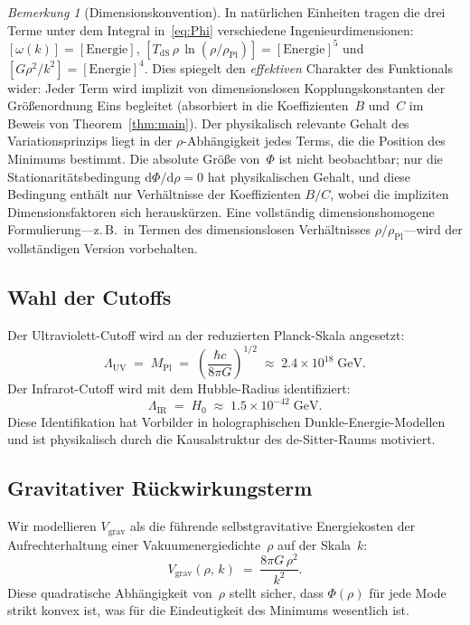 \documentclass[12pt,a4paper]{article}
\theoremstyle{definition}
\theoremstyle{plain}
\theoremstyle{remark}
\newtheorem{remark}[definition]{Bemerkung}
\newcommand{\LUV}{\Lambda_{\mathrm{UV}}}
\newcommand{\LIR}{\Lambda_{\mathrm{IR}}}
\newcommand{\dd}{\mathrm{d}}
\begin{document}
\begin{remark}[Dimensionskonvention]
In nat\"urlichen Einheiten tragen die drei Terme unter dem
Integral in~\eqref{eq:Phi} verschiedene
Ingenieurdimensionen:
$[\omega(k)] = [\mathrm{Energie}]$,
$[T_{\mathrm{dS}}\,\rho\,\ln(\rho/\rho_{\mathrm{Pl}})]
= [\mathrm{Energie}]^{5}$ und
$[G\rho^{2}/k^{2}] = [\mathrm{Energie}]^{4}$.
Dies spiegelt den \emph{effektiven} Charakter des Funktionals
wider: Jeder Term wird implizit von dimensionslosen
Kopplungskonstanten der Gr\"o\ss enordnung Eins begleitet
(absorbiert in die Koeffizienten~$B$ und~$C$ im Beweis von
Theorem~\ref{thm:main}). Der physikalisch relevante Gehalt des
Variationsprinzips liegt in der $\rho$-Abh\"angigkeit jedes
Terms, die die Position des Minimums bestimmt. Die absolute
Gr\"o\ss e von~$\Phi$ ist nicht beobachtbar; nur die
Stationarit\"atsbedingung $\dd\Phi/\dd\rho = 0$ hat
physikalischen Gehalt, und diese Bedingung enth\"alt nur
Verh\"altnisse der Koeffizienten $B/C$, wobei die impliziten
Dimensionsfaktoren sich herausk\"urzen. Eine vollst\"andig
dimensionshomogene Formulierung---z.\,B.\ in Termen des
dimensionslosen Verh\"altnisses
$\rho/\rho_{\mathrm{Pl}}$---wird der vollst\"andigen Version
vorbehalten.
\end{remark}

\subsection{Wahl der Cutoffs}

Der Ultraviolett-Cutoff wird an der reduzierten Planck-Skala angesetzt:
\begin{equation}
  \LUV \;=\; M_{\mathrm{Pl}} \;=\;
  \left(\frac{\hbar c}{8\pi G}\right)^{1/2}
  \;\approx\; 2.4 \times 10^{18}\;\mathrm{GeV}.
\end{equation}
Der Infrarot-Cutoff wird mit dem Hubble-Radius identifiziert:
\begin{equation}\label{eq:IR-cutoff}
  \LIR \;=\; H_0 \;\approx\; 1.5 \times 10^{-42}\;\mathrm{GeV}.
\end{equation}
Diese Identifikation hat Vorbilder in holographischen
Dunkle-Energie-Modellen~\cite{Li2004} und ist physikalisch durch die
Kausalstruktur des de-Sitter-Raums motiviert.

\subsection{Gravitativer R\"uckwirkungsterm}

Wir modellieren $V_{\mathrm{grav}}$ als die f\"uhrende
selbstgravitative Energiekosten der Aufrechterhaltung einer
Vakuumenergiedichte~$\rho$ auf der Skala~$k$:
\begin{equation}\label{eq:Vgrav}
  V_{\mathrm{grav}}(\rho,\,k) \;=\;
  \frac{8\pi G\,\rho^{2}}{k^{2}}.
\end{equation}
Diese quadratische Abh\"angigkeit von~$\rho$ stellt sicher, dass
$\Phi(\rho)$ f\"ur jede Mode strikt konvex ist, was f\"ur die
Eindeutigkeit des Minimums wesentlich ist.
\end{document}
